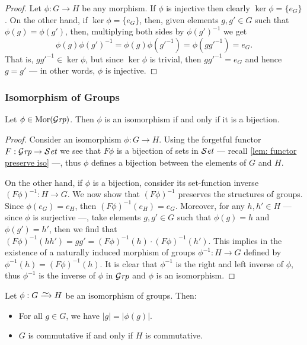 \begin{proof}
  Let \(\phi: G \to H\) be any morphism. If \(\phi\) is injective then clearly
  \(\ker\phi = \{e_G\}\). On the other hand, if \(\ker\phi = \{e_G\}\), then,
  given elements \(g, g' \in G\) such that \(\phi(g) = \phi(g')\), then,
  multiplying both sides by \(\phi{(g')}^{-1}\) we get
  \[
    \phi(g) {\phi(g')}^{-1} = \phi(g) \phi(g'^{-1}) = \phi(gg'^{-1}) = e_G.
  \]
  That is, \(gg'^{-1} \in \ker\phi\), but since \(\ker\phi\) is trivial, then
  \(gg'^{-1} = e_G\) and hence \(g = g'\) --- in other words, \(\phi\) is
  injective.
\end{proof}

\subsubsection{Isomorphism of Groups}

\begin{proposition}\label{prop: grp-iso-bij}
  Let \(\phi \in \operatorname{Mor}({\mathcal{G}\textit{rp}})\). Then \(\phi\) is an isomorphism if and only if it
  is a bijection.
\end{proposition}

\begin{proof}
  Consider an isomorphism \(\phi: G \to H\). Using the forgetful functor \(F:
  {\mathcal{G}\textit{rp}} \to {\mathcal{S}\textit{et}}\) we see that \(F\phi\) is a bijection of sets in \({\mathcal{S}\textit{et}}\) ---
  recall \cref{lem: functor preserve iso} ---, thus \(\phi\) defines a bijection
  between the elements of \(G\) and \(H\).

  On the other hand, if \(\phi\) is a bijection, consider its set-function
  inverse \({(F\phi)}^{-1}: H \to G\). We now show that \({(F\phi)}^{-1}\) preserves
  the structures of groups. Since \(\phi(e_G) = e_H\), then \({(F\phi)}^{-1}(e_H)
  = e_G\). Moreover, for any \(h, h' \in H\) --- since \(\phi\) is surjective
  ---, take elements \(g, g' \in G\) such that \(\phi(g) = h\) and \(\phi(g') =
  h'\), then we find that \({(F\phi)}^{-1}(hh') = g g' = {(F\phi)}^{-1}(h) \cdot
  {(F\phi)}^{-1}(h')\). This implies in the existence of a naturally induced
  morphism of groups \(\phi^{-1}: H \to G\) defined by \(\phi^{-1}(h) =
  {(F\phi)}^{-1}(h)\). It is clear that \(\phi^{-1}\) is the right and left
  inverse of \(\phi\), thus \(\phi^{-1}\) is the inverse of \(\phi\) in \({\mathcal{G}\textit{rp}}\)
  and \(\phi\) is an isomorphism.
\end{proof}

\begin{proposition}\label{prop: iso-order-com}
  Let \(\phi: G \isoto H\) be an isomorphism of groups. Then:
  \begin{itemize}
    \setlength\itemsep{0em}
    \item For all \(g \in G\), we have \(|g| = |\phi(g)|\).
    \item \(G\) is commutative if and only if \(H\) is commutative.
  \end{itemize}
\end{proposition}

